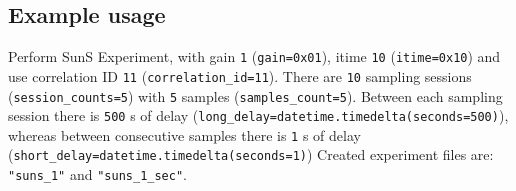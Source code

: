 \subsection{Example usage}
Perform SunS Experiment, with gain \texttt{1} (\texttt{gain=0x01}), itime \texttt{10} (\texttt{itime=0x10}) and use correlation ID \texttt{11} (\texttt{correlation\_id=11}). There are \texttt{10} sampling sessions (\texttt{session_counts=5}) with \texttt{5} samples (\texttt{samples_count=5}). Between each sampling session there is \texttt{500} s of delay (\texttt{long_delay=datetime.timedelta(seconds=500)}), whereas between consecutive samples there is \texttt{1} s of delay (\texttt{short_delay=datetime.timedelta(seconds=1)})  Created experiment files are: \texttt{"suns_1"} and \texttt{"suns_1_sec"}. 

